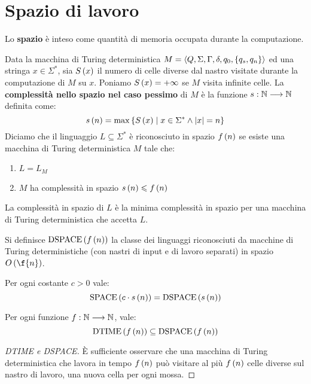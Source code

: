 \documentclass{lectures}
\begin{document}
\section{Spazio di lavoro}
\begin{multicols}{2}
\begin{definition}
    Lo \textbf{spazio} è inteso come quantità di memoria occupata durante la computazione.
\end{definition}
\begin{definition}
    Data la macchina di Turing deterministica \(M = \left\langle Q, \Sigma, \Gamma, \delta, q_0, \left\{q_s, q_n\right\}\right\rangle\) ed una stringa \(x\in\Sigma^*\), sia \(S\left(x\right)\) il numero di celle diverse dal nastro visitate durante la computazione di \(M\) su \(x\). Poniamo \(S\left(x\right) = +\infty\) se \(M\) visita infinite celle. La \textbf{complessità nello spazio nel caso pessimo} di \(M\) è la funzione \(s:\mathbb{N}\longrightarrow \mathbb{N}\) definita come:
    \[
        s\left(n\right) = \max\left\{S\left(x\right)\mid x \in \Sigma^* \land \left\lvert x\right\rvert = n\right\}
    \]
    Diciamo che il linguaggio \(L \subseteq \Sigma^*\) è riconosciuto in spazio \(f\left(n\right)\) se esiste una macchina di Turing deterministica \(M\) tale che:
    \begin{enumerate}
        \item \(L = L_M\)
        \item \(M\) ha complessità in spazio \(s\left(n\right) \leqslant f\left(n\right)\)
    \end{enumerate}
    La complessità in spazio di \(L\) è la minima complessità in spazio per una macchina di Turing deterministica che accetta \(L\).
\end{definition}
\begin{definition}[DSPACE]
    Si definisce \(\text{DSPACE}\left(f\left(n\right)\right)\) la classe dei linguaggi riconosciuti da macchine di Turing deterministiche (con nastri di input e di lavoro separati) in spazio \(O\rnd{\f{n}}\).
\end{definition}
\begin{proposition}
    Per ogni costante \(c>0\) vale:
    \[
        \text{SPACE}\left(c\cdot s\left(n\right)\right) = \text{DSPACE}\left(s\left(n\right)\right)
    \]    
\end{proposition}
\begin{theorem}
    Per ogni funzione \(f:\mathbb{N}\longrightarrow \mathbb{N}\), vale:
    \[
        \text{DTIME}\left(f\left(n\right)\right) \subseteq \text{DSPACE}\left(f\left(n\right)\right)
    \]
\end{theorem}
\begin{proof}[DTIME e DSPACE]
    È sufficiente osservare che una macchina di Turing deterministica che lavora in tempo \(f\left(n\right)\) può visitare al più \(f\left(n\right)\) celle diverse sul nastro di lavoro, una nuova cella per ogni mossa.
\end{proof}
\end{multicols}
\end{document}
